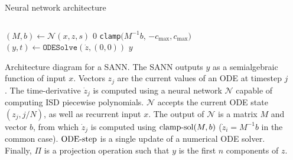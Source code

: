 \documentclass[final]{beamer}
\newcommand{\ODESolve}{\texttt{ODESolve}}
\newcommand{\SANN}{\texttt{SANN}}
\newlength{\lrcolwidth}
\begin{document}
\begin{frame}[t]
\begin{columns}[t]
\begin{column}{\lrcolwidth}
\begin{block}{Neural network architecture}
\begin{columns}
\begin{column}{0.7\textwidth}
\begin{algorithm}[H]
\begin{algorithmic}[1]
              \Function {\SANN}{$\mathcal{N}$, $x$, $c_{\max}$} 
                      \State $(M, b) \leftarrow \mathcal{N}(x, z, s)$ \label{line-Mb}
                       \label{line-M-singular-1}
                          \State \Return $0$ \label{line-M-singular-2}
                      \Else 
                          \State \Return \texttt{clamp}$(M^{-1} b$, $-c_{\max}, c_{\max})$ \label{line-clamp}
                      \EndIf
                  \EndFunction
                  \State $(y, t) \leftarrow \ODESolve( \dot{z}, (0, 0) )$ \label{line-ODESolve}
                  \State \Return $y$
              \EndFunction
            \end{algorithmic}
          \end{algorithm}

          Architecture diagram for a SANN. The SANN outputs $y$ as a semialgebraic function of input $x$. Vectors $z_j$ are the current values of an ODE at timestep $j$. The time-derivative $\dot{z}_j$ is computed using a neural network $\mathcal{N}$ capable of computing ISD piecewise polynomials. $\mathcal{N}$ accepts the current ODE state $(z_j, j/N)$, as well as recurrent input $x$. The output of $\mathcal{N}$ is a matrix $M$ and vector $b$, from which $\dot{z}_j$ is computed using $\hbox{clamp-sol}(M, b)$ ($\dot{z}_i = M^{-1} b$ in the common case). $\hbox{ODE-step}$ is a single update of a numerical ODE solver. Finally, $\Pi$ is a projection operation such that $y$ is the first $n$ components of $z$. 
      \end{column}
      \begin{column}{0.3\textwidth}



\end{column}
\end{columns}
\end{block}
\end{column}
\end{columns}
\end{frame}
\end{document}
